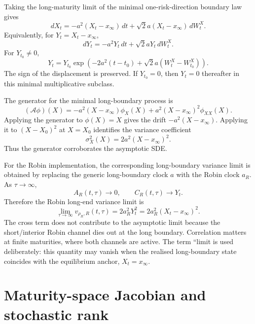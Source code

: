 \documentclass[11pt]{article}
\numberwithin{equation}{section}
\begin{document}
Taking the long-maturity limit of the minimal one-risk-direction boundary law gives
\begin{equation}
\label{eq:long-boundary-sde-X}
dX_t
=
-a^2(X_t-x_\infty)\,dt
+
\sqrt{2}a(X_t-x_\infty)\,dW_t^X.
\end{equation}
Equivalently, for \(Y_t=X_t-x_\infty\),
\begin{equation}
\label{eq:multiplicative-displacement-law}
dY_t
=
-a^2Y_t\,dt
+
\sqrt{2}aY_t\,dW_t^X.
\end{equation}
For \(Y_{t_0}\neq0\),
\begin{equation}
\label{eq:Y-explicit-solution}
Y_t
=
Y_{t_0}
\exp\left(-2a^2(t-t_0)+\sqrt{2}a(W_t^X-W_{t_0}^X)\right).
\end{equation}
The sign of the displacement is preserved. If \(Y_{t_0}=0\), then \(Y_t=0\) thereafter in this minimal multiplicative subclass.

The generator for the minimal long-boundary process is
\begin{equation}
\label{eq:long-boundary-generator}
(\mathcal A\phi)(X)
=
-a^2(X-x_\infty)\phi_X(X)
+
a^2(X-x_\infty)^2\phi_{XX}(X).
\end{equation}
Applying the generator to \(\phi(X)=X\) gives the drift \(-a^2(X-x_\infty)\). Applying it to \((X-X_0)^2\) at \(X=X_0\) identifies the variance coefficient
\[
\sigma_X^2(X)=2a^2(X-x_\infty)^2.
\]
Thus the generator corroborates the asymptotic SDE.

For the Robin implementation, the corresponding long-boundary variance limit is obtained by replacing the generic long-boundary clock \(a\) with the Robin clock \(a_R\). As \(\tau\to\infty\),
\[
A_R(t,\tau)\to0,
\qquad
C_R(t,\tau)\to Y_t.
\]
Therefore the Robin long-end variance limit is
\begin{equation}
\label{eq:long-end-variance-floor}
\lim_{\tau\to\infty}v_{\rho_R,R}(t,\tau)
=
2a_R^2Y_t^2
=
2a_R^2(X_t-x_\infty)^2.
\end{equation}
The cross term does not contribute to the asymptotic limit because the short/interior Robin channel dies out at the long boundary. Correlation matters at finite maturities, where both channels are active. The term ``limit is used deliberately: this quantity may vanish when the realised long-boundary state coincides with the equilibrium anchor, \(X_t=x_\infty\).


\section{Maturity-space Jacobian and stochastic rank}
\end{document}
